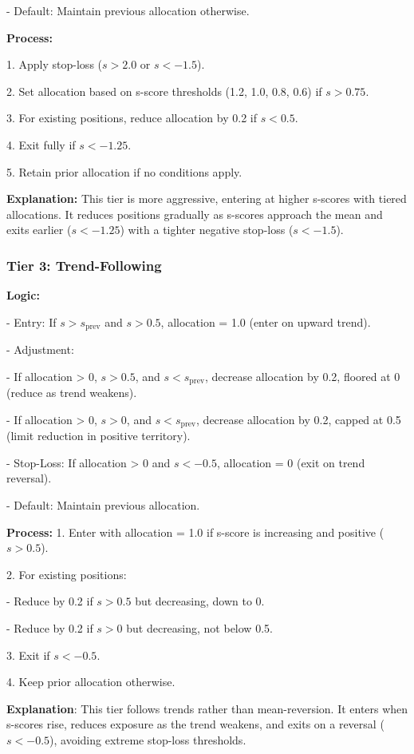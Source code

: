 \documentclass[a4paper,12pt]{article}
\begin{document}
- Default: Maintain previous allocation otherwise.

\textbf{Process:}

1. Apply stop-loss (\(s > 2.0\) or \(s < -1.5\)).

2. Set allocation based on s-score thresholds (1.2, 1.0, 0.8, 0.6) if \(s > 0.75\).

3. For existing positions, reduce allocation by 0.2 if \(s < 0.5\).

4. Exit fully if \(s < -1.25\).

5. Retain prior allocation if no conditions apply.

\textbf{Explanation:} This tier is more aggressive, entering at higher s-scores with tiered allocations. It reduces positions gradually as s-scores approach the mean and exits earlier (\(s < -1.25\)) with a tighter negative stop-loss (\(s < -1.5\)).

\subsubsection{Tier 3: Trend-Following}

\textbf{Logic:}

- Entry: If \(s > s_{\text{prev}}\) and \(s > 0.5\), allocation = 1.0 (enter on upward trend).

- Adjustment:

  - If allocation > 0, \(s > 0.5\), and \(s < s_{\text{prev}}\), decrease allocation by 0.2, floored at 0 (reduce as trend weakens).
  
  - If allocation > 0, \(s > 0\), and \(s < s_{\text{prev}}\), decrease allocation by 0.2, capped at 0.5 (limit reduction in positive territory).
  
- Stop-Loss: If allocation > 0 and \(s < -0.5\), allocation = 0 (exit on trend reversal).

- Default: Maintain previous allocation.

\textbf{Process:}
1. Enter with allocation = 1.0 if s-score is increasing and positive (\(s > 0.5\)).

2. For existing positions:

   - Reduce by 0.2 if \(s > 0.5\) but decreasing, down to 0.
   
   - Reduce by 0.2 if \(s > 0\) but decreasing, not below 0.5.
   
3. Exit if \(s < -0.5\).

4. Keep prior allocation otherwise.

\textbf{Explanation}: This tier follows trends rather than mean-reversion. It enters when s-scores rise, reduces exposure as the trend weakens, and exits on a reversal (\(s < -0.5\)), avoiding extreme stop-loss thresholds.
\end{document}
